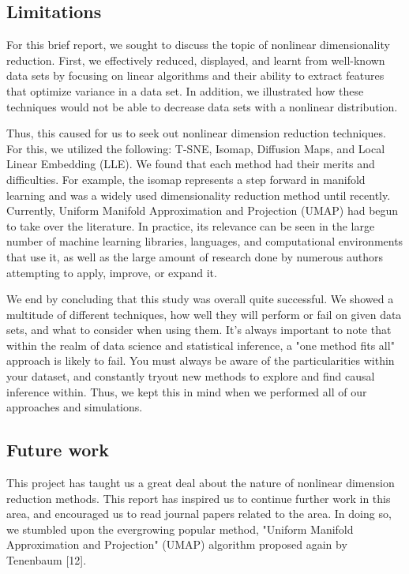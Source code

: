 \documentclass[12pt]{article}
\begin{document}
\subsection{Limitations}
\hspace{5mm}For this brief report, we sought to discuss the topic of nonlinear dimensionality reduction. First, we effectively reduced, displayed, and learnt from well-known data sets by focusing on linear algorithms and their ability to extract features that optimize variance in a data set. In addition, we illustrated how these techniques would not be able to decrease data sets with a nonlinear distribution.

Thus, this caused for us to seek out nonlinear dimension reduction techniques. For this, we utilized the following: T-SNE, Isomap, Diffusion Maps, and Local Linear Embedding (LLE). We found that each method had their merits and difficulties. For example, the isomap represents a step forward in manifold learning and was a widely used dimensionality reduction method until recently. Currently, Uniform Manifold Approximation and Projection (UMAP) had begun to take over the literature. In practice, its relevance can be seen in the large number of machine learning libraries, languages, and computational environments that use it, as well as the large amount of research done by numerous authors attempting to apply, improve, or expand it.

We end by concluding that this study was overall quite successful. We showed a multitude of different techniques, how well they will perform or fail on given data sets, and what to consider when using them. It's always important to note that within the realm of data science and statistical inference, a "one method fits all" approach is likely to fail. You must always be aware of the particularities within your dataset, and constantly tryout new methods to explore and find causal inference within. Thus, we kept this in mind when we performed all of our approaches and simulations.

\subsection{Future work}
\hspace{5mm}This project has taught us a great deal about the nature of nonlinear dimension reduction methods. This report has inspired us to continue further work in this area, and encouraged us to read journal papers related to the area. In doing so, we stumbled upon the evergrowing popular method, "Uniform Manifold Approximation and Projection" (UMAP) algorithm proposed again by Tenenbaum [12].
\end{document}
